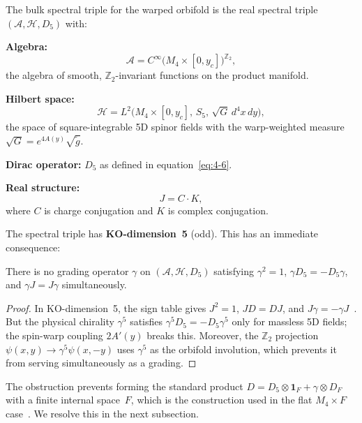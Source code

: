 \begin{definition}\label{def:4-1}
The bulk spectral triple for the warped orbifold is the real spectral triple $(\mathcal{A}, \mathcal{H}, D_5)$ with:

\textbf{Algebra:}
\begin{equation}
  \mathcal{A} = C^\infty\!\bigl(M_4 \times [0, y_c]\bigr)^{\mathbb{Z}_2},
  \label{eq:4-10}
\end{equation}
the algebra of smooth, $\mathbb{Z}_2$-invariant functions on the product manifold.

\textbf{Hilbert space:}
\begin{equation}
  \mathcal{H} = L^2\!\bigl(M_4 \times [0, y_c],\, S_5,\, \sqrt{G}\, d^4x\, dy\bigr),
  \label{eq:4-11}
\end{equation}
the space of square-integrable 5D spinor fields with the warp-weighted measure $\sqrt{G} = e^{4A(y)}\sqrt{\tilde{g}}$.

\textbf{Dirac operator:} $D_5$ as defined in equation~\eqref{eq:4-6}.

\textbf{Real structure:}
\begin{equation}
  J = C \cdot K,
  \label{eq:4-12}
\end{equation}
where $C$ is charge conjugation and $K$ is complex conjugation.
\end{definition}

The spectral triple has \textbf{KO-dimension~5} (odd). This has an immediate consequence:

\begin{proposition}\label{prop:4-1}
There is no grading operator $\gamma$ on $(\mathcal{A}, \mathcal{H}, D_5)$ satisfying $\gamma^2 = 1$, $\gamma D_5 = -D_5 \gamma$, and $\gamma J = J\gamma$ simultaneously.
\end{proposition}

\begin{proof}
In KO-dimension~5, the sign table gives $J^2 = 1$, $JD = DJ$, and $J\gamma = -\gamma J$~\cite{ch4:Connes1994}. But the physical chirality $\gamma^5$ satisfies $\gamma^5 D_5 = -D_5 \gamma^5$ only for massless 5D fields; the spin-warp coupling $2A'(y)$ breaks this. Moreover, the $\mathbb{Z}_2$ projection $\psi(x,y) \to \gamma^5 \psi(x,-y)$ uses $\gamma^5$ as the orbifold involution, which prevents it from serving simultaneously as a grading.
\end{proof}

The obstruction prevents forming the standard product $D = D_5 \otimes \mathbf{1}_F + \gamma \otimes D_F$ with a finite internal space~$F$, which is the construction used in the flat $M_4 \times F$ case~\cite{ch4:CC1997}. We resolve this in the next subsection.


